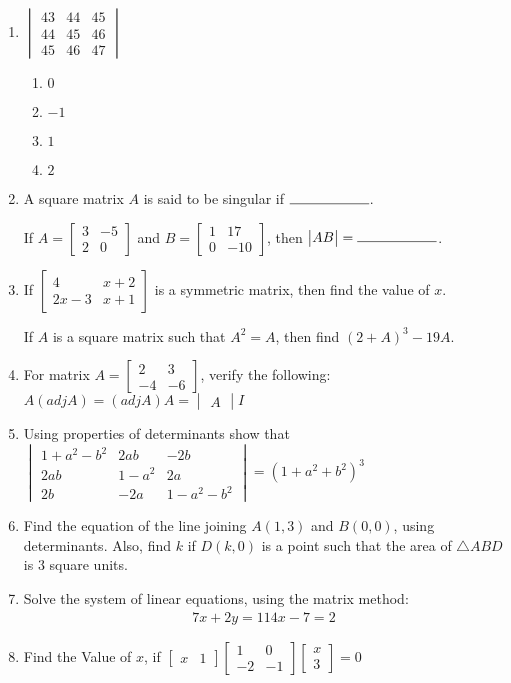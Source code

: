 \documentclass{article}
\providecommand{\myvec}[1]{\begin{bmatrix}#1\end{bmatrix}}
\providecommand{\mydet}[1]{\begin{vmatrix}#1\end{vmatrix}}
\begin{document}
\begin{enumerate}
   \item
    $\mydet{43 & 44 & 45 \\ 44 & 45 & 46 \\ 45 & 46 & 47}$
    \begin{enumerate}
        \item $0$
        \item $-1$
        \item $1$
        \item $2$
    \end{enumerate}

    \item A square matrix $A$ is said to be singular if $\rule{2cm}{0.15mm}$.

    If $A =\myvec{3 & -5 \\ 2 & 0}$ and 
    $B = \myvec{1 & 17 \\ 0 & -10}$, then $\mydet{AB} = \rule{2cm}{0.15mm}$.

    \item If $\myvec{4 & x+2 \\ 2x-3 & x+1}$ is a symmetric matrix, then find the value of $x$.

    If $A$ is a square matrix such that $A^2 = A$, then find $(2+A)^3 - 19A$.

    \item For matrix $A = \myvec{2 & 3 \\ -4 & -6}$, verify the following:
	    $A(adj A) = (adj A)A = \mydet{A}I$

    \item Using properties of determinants show that
    $\mydet{1 + a^2 - b^2 & 2ab & -2b \\ 2ab & 1 - a^2 & 2a \\ 2b & -2a & 1 - a^2 - b^2 } = (1 + a^2 + b^2)^3$

    \item Find the equation of the line joining $A(1, 3)$ and $B(0, 0)$, using determinants. Also, find $k$ if $D(k, 0)$ is a point such that the area of $\triangle{ABD}$ is $3$ square units.
    
    \item Solve the system of linear equations, using the matrix method:
    \begin{align*}
        7x + 2y = 11
        4x - 7 = 2
    \end{align*}
    
    \item Find the Value of $x$, if
    $\myvec{x & 1}
    \myvec{1 & 0 \\ -2 & -1}
    \myvec{x \\ 3} = 0$
    

\end{enumerate}
\end{document}
